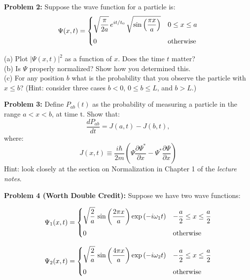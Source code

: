 \documentclass[12pt]{article}
\begin{document}
\vskip 1cm
\noindent
{\bf Problem 2:} Suppose the wave function for a particle is:
\begin{displaymath}
  \Psi(x,t) =
  \begin{cases}    
    {\displaystyle \sqrt{\frac{\pi}{2a}}\, e^{it/t_0} \, \sqrt{\sin\left(\frac{\pi x}{a}\right)}} & {\displaystyle 0 \leq x \leq a} \\[10pt]
    {\displaystyle 0} & {\displaystyle {\rm otherwise}} \\
  \end{cases}
\end{displaymath}

\noindent
(a) Plot $|\Psi(x,t)|^2$ as a function of $x$.  Does the time $t$ matter? \\[5pt]
(b) Is $\Psi$ properly normalized?  Show how you determined this.\\[5pt]
(c) For any position $b$ what is the probability that you observe the particle with $x \leq b$?  (Hint: consider three cases $b<0$, $0 \leq b \leq L$, and $b > L$.)

\vskip 1cm
\noindent
{\bf Problem 3:} Define $P_{ab}(t)$ as the probability of measuring a particle in the range $a< x < b$, at time t.  Show that:
\begin{displaymath}
  \frac{dP_{ab}}{dt} = J(a, t) - J(b, t),
\end{displaymath}
where:
\begin{displaymath}
  J(x, t) \equiv \frac{i \hbar}{2m}
  \left( \Psi \frac{\partial \Psi^*}{\partial x} - \Psi^* \frac{\partial \Psi}{\partial x}\right)
\end{displaymath}
Hint: look closely at the section on Normalization in Chapter 1 of the {\em lecture notes}.

\vskip 1cm
\noindent
{\bf Problem 4 (Worth Double Credit):} Suppose we have two wave functions:

\begin{displaymath}
  \Psi_1(x,t) =
  \begin{cases}    
    {\displaystyle \sqrt{\frac{2}{a}} \, \sin\left(\frac{2 \pi x}{a}\right) \exp\left(-i \omega_1 t\right)} & {\displaystyle -\frac{a}{2} \leq x \leq \frac{a}{2}} \\[10pt]
    {\displaystyle 0} & {\displaystyle {\rm otherwise}} \\
  \end{cases}
\end{displaymath}

\begin{displaymath}
  \Psi_2(x,t) =
  \begin{cases}    
    {\displaystyle \sqrt{\frac{2}{a}} \, \sin\left(\frac{4 \pi x}{a}\right) \exp\left(-i \omega_2 t\right)} & {\displaystyle -\frac{a}{2} \leq x \leq \frac{a}{2}} \\[10pt]
    {\displaystyle 0} & {\displaystyle {\rm otherwise}} \\
  \end{cases}
\end{displaymath}
\end{document}

